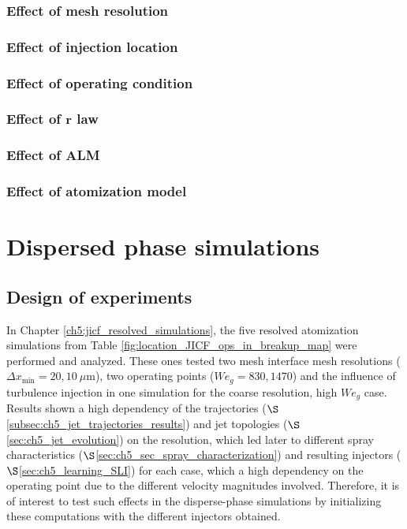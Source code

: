 \subsubsection*{Effect of mesh resolution}

\subsubsection*{Effect of injection location}

\subsubsection*{Effect of operating condition}

\subsubsection*{Effect of $\textbf{r}$ law}

\subsubsection*{Effect of ALM}

\subsubsection*{Effect of atomization model}

\clearpage

\section{Dispersed phase simulations}


\subsection{Design of experiments}


In Chapter \ref{ch5:jicf_resolved_simulations}, the five resolved atomization simulations from Table \ref{fig:location_JICF_ops_in_breakup_map} were performed and analyzed. These ones tested two mesh interface mesh resolutions ($\Delta x_\mathrm{min} = 20, 10~\mu$m), two operating points ($We_g = 830, 1470$) and the influence of turbulence injection in one simulation for the coarse resolution, high $We_g$ case. Results shown a high dependency of the trajectories ($\S$\ref{subsec:ch5_jet_trajectories_results}) and jet topologies ($\S$\ref{sec:ch5_jet_evolution}) on the resolution, which led later to different spray characteristics ($\S$\ref{sec:ch5_sec_spray_characterization}) and resulting injectors ($\S$\ref{sec:ch5_learning_SLI}) for each case, which a high dependency on the operating point due to the different velocity magnitudes involved. Therefore, it is of interest to test such effects in the disperse-phase simulations by initializing these computations with the different injectors obtained.

